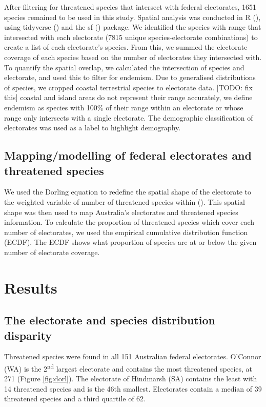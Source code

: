 \documentclass[a4paper,11pt]{article}
\begin{document}
After filtering for threatened species that intersect with federal electorates, 1651 species remained to be used in this study. Spatial analysis was conducted in R (\cite{rcoreteamLanguageEnvironmentStatistical2021}), using tidyverse (\cite{wickhamWelcomeTidyverse2019}) and the sf (\cite{pebesmaSimpleFeaturesStandardized2018}) package. We identified the species with range that intersected with each electorate (7815 unique species-electorate combinations) to create a list of each electorate's species. From this, we summed the electorate coverage of each species based on the number of electorates they intersected with. To quantify the spatial overlap, we calculated the intersection of species and electorate, and used this to filter for endemism. Due to generalised distributions of species, we cropped coastal terrestrial species to electorate data. [TODO: fix this] coastal and island areas do not represent their range accurately, we define endemism as species with 100\% of their range within an electorate or whose range only intersects with a single electorate. The demographic classification of electorates was used as a label to highlight demography.

\subsection{Mapping/modelling of federal electorates and threatened species}

We used the Dorling equation to redefine the spatial shape of the electorate to the weighted variable of number of threatened species within (\cite{hahnTmapMakingMaps,jeworutzkiCartogramCreateCartograms2020}). This spatial shape was then used to map Australia's electorates and threatened species information. To calculate the proportion of threatened species which cover each number of electorates, we used the empirical cumulative distribution function (ECDF). The ECDF shows what proportion of species are at or below the given number of electorate coverage.

\section{Results}

\subsection{The electorate and species distribution disparity}

Threatened species were found in all 151 Australian federal electorates. O'Connor (WA) is the 2\textsuperscript{nd} largest electorate and contains the most threatened species, at 271 (Figure \ref{fig:dorl}). The electorate of Hindmarsh (SA) contains the least with 14 threatened species and is the 46th smallest. Electorates contain a median of 39 threatened species and a third quartile of 62.
\end{document}
